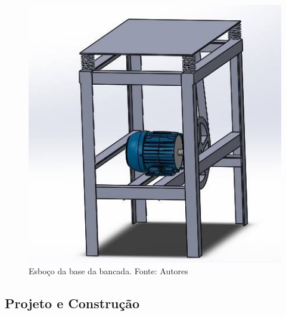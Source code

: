 \begin{figure}[!ht]
\centering
\includegraphics[scale=0.5]{figuras/motor_catia.jpg}
\caption{Esboço da base da bancada. Fonte: Autores}
\label{fig:motor_catia}
\end{figure}

\subsection{Projeto e Construção}

